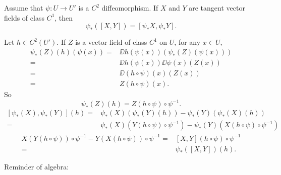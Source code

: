 \begin{propositionenv}
    Assume that $\psi : U \rightarrow U'$ is a $C^2$ diffeomorphism.
    If $X$ and $Y$ are tangent vector fields of class $C^1$, then 
    $$\psi_*\left([X,Y]\right) = [\psi_* X, \psi_* Y].$$
\end{propositionenv}
\begin{proofenv}
    Let $h \in C^2(U')$.
    If $Z$ is a vector field of class $C^1$ on $U$, for any $x \in U$,
    $$\begin{aligned}
        \psi_*(Z)(h)(\psi(x)) = & \DD h (\psi(x))\left(\psi_*(Z) (\psi(x))\right)\\
        = & \DD h (\psi(x))\DD \psi(x)(Z(x))\\
        = & \DD(h \circ \psi)(x)(Z(x))\\
        = & Z(h \circ \psi)(x).
    \end{aligned}$$
    So $$\psi_*(Z)(h) = Z(h \circ \psi) \circ \psi^{-1}.$$
    $$\begin{aligned}
        [\psi_* (X), \psi_* (Y)](h) = & \psi_*(X)(\psi_* (Y)(h)) - \psi_*(Y)(\psi_*(X)(h))\\
        = & \psi_*(X)(Y(h \circ \psi) \circ \psi^{-1}) - \psi_*(Y)(X(h \circ \psi) \circ \psi^{-1})
    \end{aligned}$$
    $$\begin{aligned}
        X(Y(h \circ \psi)) \circ \psi^{-1} - Y(X(h \circ \psi)) \circ \psi^{-1} = & [X,Y](h \circ \psi) \circ \psi^{-1}\\
        = & \psi_*([X,Y])(h).
    \end{aligned}$$
\end{proofenv}

Reminder of algebra:

